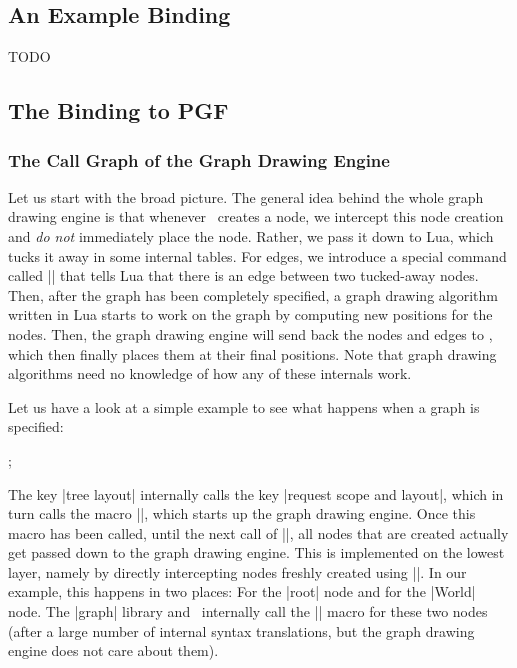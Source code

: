 

\subsection{An Example Binding}

\label{section-gd-binding-layer-example}
TODO

\subsection{The Binding to PGF}

\subsubsection{The Call Graph of the Graph Drawing Engine}

Let us start with the broad picture. The general idea behind the whole
graph drawing engine is that whenever \pgfname\ creates a node, we
intercept this node creation and \emph{do not} immediately place the
node. Rather, we pass it down to Lua, which tucks it away in
some internal tables. For edges, we introduce a special command called
|\pgfgdedge| that tells Lua that there is an edge between two
tucked-away nodes. Then, after the graph has been completely
specified, a graph drawing algorithm written in Lua starts to work on
the graph by computing new positions for the nodes. Then, the graph
drawing engine will send back the nodes and edges to \pgfname, which
then finally places them at their final positions.
Note that graph drawing algorithms need no knowledge of how any of
these internals work.

Let us have a look at a simple example to see what happens when a
graph is specified:

\begin{codeexample}[]
  ;
\end{codeexample}

The key |tree layout| internally calls the key |request scope and layout|,
which in turn calls the macro |\pgfgdbeginscope|, which starts up the
graph drawing engine. Once this macro has been 
called, until the next call of |\pgfgdendscope|, all nodes that are
created actually get passed down to the graph drawing engine. This is
implemented on the lowest layer, namely by directly intercepting
nodes freshly created using |\pgfnode|. In our example, this happens
in two places: For the |root| node and for the |World| node. The
|graph| library and \tikzname\ internally call the |\pgfnode| macro
for these two nodes (after a large number of internal syntax
translations, but the graph drawing engine does not care about them).

